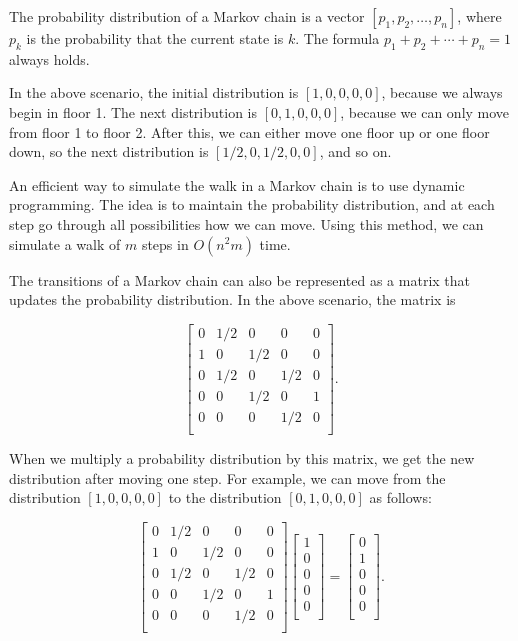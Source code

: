 The probability distribution
of a Markov chain is a vector
$[p_1,p_2,\ldots,p_n]$, where $p_k$ is the
probability that the current state is $k$.
The formula $p_1+p_2+\cdots+p_n=1$ always holds.

In the above scenario, the initial distribution is
$[1,0,0,0,0]$, because we always begin in floor 1.
The next distribution is $[0,1,0,0,0]$,
because we can only move from floor 1 to floor 2.
After this, we can either move one floor up
or one floor down, so the next distribution is
$[1/2,0,1/2,0,0]$, and so on.

An efficient way to simulate the walk in
a Markov chain is to use dynamic programming.
The idea is to maintain the probability distribution,
and at each step go through all possibilities
how we can move.
Using this method, we can simulate
a walk of $m$ steps in $O(n^2 m)$ time.

The transitions of a Markov chain can also be
represented as a matrix that updates the
probability distribution.
In the above scenario, the matrix is

\[
 \begin{bmatrix}
  0 & 1/2 & 0 & 0 & 0 \\
  1 & 0 & 1/2 & 0 & 0 \\
  0 & 1/2 & 0 & 1/2 & 0 \\
  0 & 0 & 1/2 & 0 & 1 \\
  0 & 0 & 0 & 1/2 & 0 \\
 \end{bmatrix}.
\]

When we multiply a probability distribution by this matrix,
we get the new distribution after moving one step.
For example, we can move from the distribution
$[1,0,0,0,0]$ to the distribution
$[0,1,0,0,0]$ as follows:

\[
 \begin{bmatrix}
  0 & 1/2 & 0 & 0 & 0 \\
  1 & 0 & 1/2 & 0 & 0 \\
  0 & 1/2 & 0 & 1/2 & 0 \\
  0 & 0 & 1/2 & 0 & 1 \\
  0 & 0 & 0 & 1/2 & 0 \\
 \end{bmatrix}
 \begin{bmatrix}
  1 \\
  0 \\
  0 \\
  0 \\
  0 \\
 \end{bmatrix}
=
 \begin{bmatrix}
  0 \\
  1 \\
  0 \\
  0 \\
  0 \\
 \end{bmatrix}.
\]

